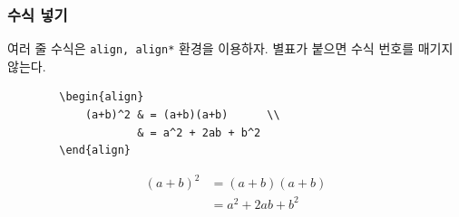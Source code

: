 \begin{frame}[fragile]
    \frametitle{수식 넣기}

    여러 줄 수식은 \texttt{align, align*} 환경을 이용하자. 별표가 붙으면 수식 번호를 매기지 않는다.

    \begin{verbatim}
        \begin{align}
            (a+b)^2 & = (a+b)(a+b)      \\
                    & = a^2 + 2ab + b^2
        \end{align}
    \end{verbatim}
    \begin{align}
        (a+b)^2 & = (a+b)(a+b)      \\
                & = a^2 + 2ab + b^2
    \end{align}

\end{frame}



